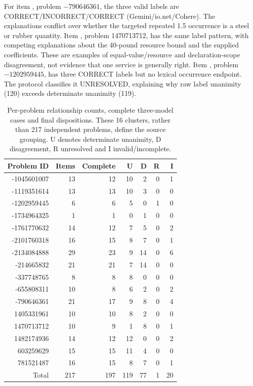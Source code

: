 For item , problem $-790646361$, the three valid labels are CORRECT/INCORRECT/CORRECT (Gemini/io.net/Cohere). The explanations conflict over whether the targeted repeated 1.5 occurrence is a steel or rubber quantity. Item , problem 1470713712, has the same label pattern, with competing explanations about the 40-pound resource bound and the supplied coefficients. These are examples of equal-value/resource and declaration-scope disagreement, not evidence that one service is generally right. Item , problem $-1202959445$, has three CORRECT labels but no lexical occurrence endpoint. The protocol classifies it UNRESOLVED, explaining why raw label unanimity (120) exceeds determinate unanimity (119).

\begin{table}[htbp]\centering\small
\caption{Per-problem relationship counts, complete three-model cases and final dispositions. These 16 clusters, rather than 217 independent problems, define the source grouping. U denotes determinate unanimity, D disagreement, R unresolved and I invalid/incomplete.}\label{tab:relationship-clusters}
\begin{tabular}{@{}rrrrrrr@{}}\toprule
Problem ID & Items & Complete & U & D & R & I\\\midrule
-1045601007 & 13 & 12 & 10 & 2 & 0 & 1\\
-1119351614 & 13 & 13 & 10 & 3 & 0 & 0\\
-1202959445 & 6 & 6 & 5 & 0 & 1 & 0\\
-1734964325 & 1 & 1 & 0 & 1 & 0 & 0\\
-1761770632 & 14 & 12 & 7 & 5 & 0 & 2\\
-2101760318 & 16 & 15 & 8 & 7 & 0 & 1\\
-2134084888 & 29 & 23 & 9 & 14 & 0 & 6\\
-214665832 & 21 & 21 & 7 & 14 & 0 & 0\\
-337748765 & 8 & 8 & 8 & 0 & 0 & 0\\
-655808311 & 10 & 8 & 6 & 2 & 0 & 2\\
-790646361 & 21 & 17 & 9 & 8 & 0 & 4\\
1405331961 & 10 & 10 & 8 & 2 & 0 & 0\\
1470713712 & 10 & 9 & 1 & 8 & 0 & 1\\
1482174936 & 14 & 12 & 12 & 0 & 0 & 2\\
603259629 & 15 & 15 & 11 & 4 & 0 & 0\\
781521487 & 16 & 15 & 8 & 7 & 0 & 1\\
\midrule
Total & 217 & 197 & 119 & 77 & 1 & 20\\\bottomrule
\end{tabular}\end{table}

